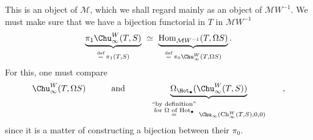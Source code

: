 \newpage


This is an object of $\mathcal{M}$, which we shall regard mainly as an object of $\mathcal{M}W^{-1}$. We must make sure that we have a bijection functorial in $T$ in $\mathcal{M}W^{-1}$
\[
\underbrace{\pi_1\Chu^W_\infty(T, S)}_{\overset{\text{def}}{=}\,\pi_1(T,S)} \ \simeq\ \underbrace{\mathrm{Hom}_{\mathcal{M}W^{-1}}(T, \Omega S)}_{\overset{\text{def}}{=}\,\pi_0\Chu^W_\infty(T,\Omega S)}.
\]
For this, one must compare
\[
\Chu^W_\infty(T, \Omega S) \qquad\quad \text{and} \qquad\quad \underbrace{\Omega_{\Hot_\bullet}(\Chu^W_\infty(T, S))}_{\overset{\substack{\text{``by definition''}\\ \text{for $\Omega$ of $\mathrm{Hot}_\bullet$}}}{=}\ \Chu_\infty(\mathrm{Ch}^W_\infty(T,S);0,0)} \qquad ,
\]
since it is a matter of constructing a bijection between their $\pi_0$.